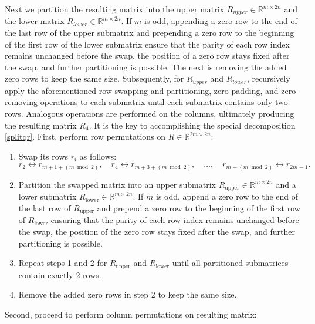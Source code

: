 \documentclass[12pt]{article}
\numberwithin{equation}{section}
\begin{document}
Next we partition the resulting matrix into the upper matrix $R_{upper}\in \mathbb{R}^{m \times 2n}$ and the lower matrix $R_{lower}\in \mathbb{R}^{m \times 2n}$. If $m$ is odd, appending a zero row to the end of the last row of the upper submatrix and prepending a zero row to the beginning of the first row of the lower submatrix ensure that the parity of each row index remains unchanged before the swap, the position of a zero row stays fixed after the swap, and further partitioning is possible. The next is removing the added zero rows to keep the same size. Subsequently, for  $R_{upper}$ and $ R_{lower}$, recursively apply the aforementioned row swapping and partitioning, zero-padding, and zero-removing operations to each submatrix until each submatrix contains only two rows. Analogous operations are performed on the columns, ultimately producing the resulting matrix $R_4$.
It is the key to accomplishing the special decomposition \eqref{splitqr}.
\fi
\newline
\newline
First, perform row permutations on $R\in \mathbb{R}^{2m \times 2n}$:
\begin{enumerate}
\item Swap its rows $r_i$ as follows:  
   \begin{equation} \label{eq:rowswap}
       r_2 \leftrightarrow r_{m + 1 + (m \bmod 2)}, \quad r_4 \leftrightarrow r_{m + 3 + (m \bmod 2)}, \quad \dots, \quad r_{m - (m \bmod 2)} \leftrightarrow r_{2m - 1}.
   \end{equation}
\item  Partition the swapped matrix into an upper submatrix \( R_{\text{upper}} \in \mathbb{R}^{m \times 2n} \) and a lower submatrix \( R_{\text{lower}} \in \mathbb{R}^{m \times 2n} \). If \( m \) is odd, append a zero row to the end of the last row of \( R_{\text{upper}} \) and prepend a zero row to the beginning of the first row of \( R_{\text{lower}} \) ensuring that the parity of each row index remains unchanged before the swap, the position of the zero row stays fixed after the swap, and further partitioning is possible.
 
\item Repeat steps 1 and 2 for \( R_{\text{upper}} \) and \( R_{\text{lower}} \) until all  partitioned submatrices contain exactly 2 rows.  
 
\item  Remove the added zero rows in step 2 to keep the same size.
\end{enumerate}
Second, proceed to perform column permutations on resulting matrix:
\end{document}
